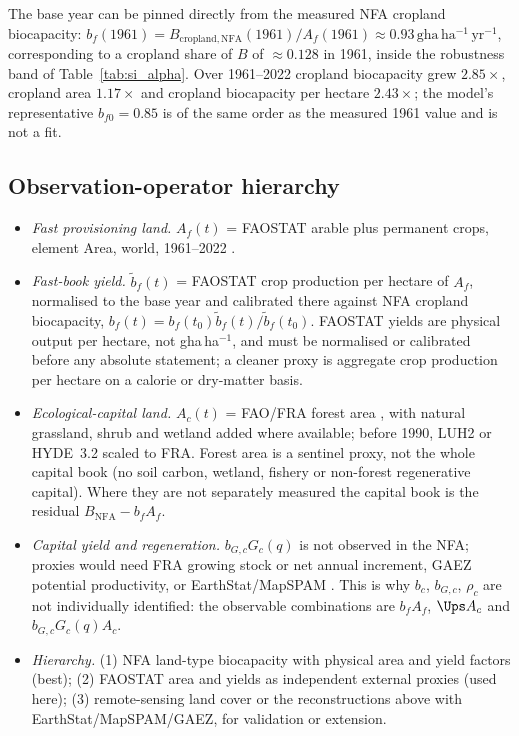 The base year can be pinned directly from the measured NFA cropland biocapacity: $b_f(1961)=B_{\mathrm{cropland,NFA}}(1961)/A_f(1961)\approx0.93\,\mathrm{gha\,ha^{-1}\,yr^{-1}}$, corresponding to a cropland share of $B$ of $\approx0.128$ in 1961, inside the robustness band of Table~\ref{tab:si_alpha}. Over 1961--2022 cropland biocapacity grew $2.85\times$, cropland area $1.17\times$ and cropland biocapacity per hectare $2.43\times$; the model's representative $b_{f0}=0.85$ is of the same order as the measured 1961 value and is not a fit.

\subsection{Observation-operator hierarchy}\label{si:operator}

\begin{itemize}[leftmargin=1.5em]
\item \emph{Fast provisioning land.} $A_f(t)$ = FAOSTAT arable plus permanent crops, element Area, world, 1961--2022 \citep{FAO2023}.
\item \emph{Fast-book yield.} $\tilde b_f(t)$ = FAOSTAT crop production per hectare of $A_f$, normalised to the base year and calibrated there against NFA cropland biocapacity, $b_f(t)=b_f(t_0)\tilde b_f(t)/\tilde b_f(t_0)$. FAOSTAT yields are physical output per hectare, not gha\,ha$^{-1}$, and must be normalised or calibrated before any absolute statement; a cleaner proxy is aggregate crop production per hectare on a calorie or dry-matter basis.
\item \emph{Ecological-capital land.} $A_c(t)$ = FAO/FRA forest area \citep{FAO2020}, with natural grassland, shrub and wetland added where available; before 1990, LUH2 \citep{Hurtt2011} or HYDE~3.2 \citep{KleinGoldewijk2017} scaled to FRA. Forest area is a sentinel proxy, not the whole capital book (no soil carbon, wetland, fishery or non-forest regenerative capital). Where they are not separately measured the capital book is the residual $B_{\mathrm{NFA}}-b_fA_f$.
\item \emph{Capital yield and regeneration.} $b_{G,c}G_c(q)$ is not observed in the NFA; proxies would need FRA growing stock or net annual increment, GAEZ potential productivity, or EarthStat/MapSPAM \citep{Monfreda2008}. This is why $b_c$, $b_{G,c}$, $\rho_c$ are not individually identified: the observable combinations are $b_fA_f$, $\Ups A_c$ and $b_{G,c}G_c(q)A_c$.
\item \emph{Hierarchy.} (1) NFA land-type biocapacity with physical area and yield factors (best); (2) FAOSTAT area and yields as independent external proxies (used here); (3) remote-sensing land cover \citep{ESA2017,Copernicus2019} or the reconstructions above with EarthStat/MapSPAM/GAEZ, for validation or extension.
\end{itemize}


